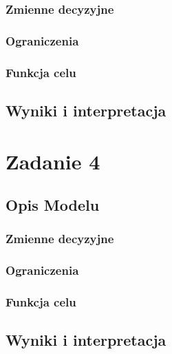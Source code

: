 \documentclass{article}
\begin{document}
\subsubsection{Zmienne decyzyjne}
\subsubsection{Ograniczenia}
\subsubsection{Funkcja celu}
\subsection{Wyniki i interpretacja}

\section{Zadanie 4}
\subsection{Opis Modelu}
\subsubsection{Zmienne decyzyjne}
\subsubsection{Ograniczenia}
\subsubsection{Funkcja celu}
\subsection{Wyniki i interpretacja}
\end{document}

